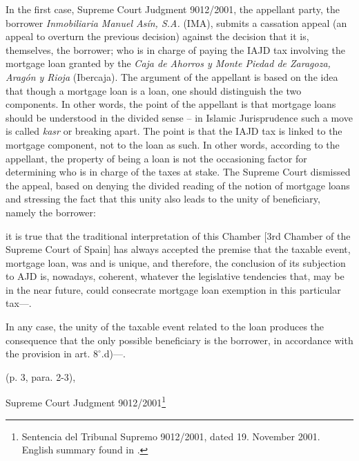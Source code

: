 				In the first case, Supreme Court Judgment 9012/2001, the appellant party, the borrower \textit{Inmobiliaria Manuel Asín, S.A.} (IMA), submits a cassation appeal (an appeal to overturn the previous decision) against the decision that it is, themselves, the borrower; who is in charge of paying the IAJD tax involving the mortgage loan granted by the \textit{Caja de Ahorros y Monte Piedad de Zaragoza, Aragón y Rioja} (Ibercaja). The argument of the appellant is based on the idea that though a mortgage loan is a loan, one should distinguish the two components. In other words, the point of the appellant is that mortgage loans should be understood in the divided sense – in Islamic Jurisprudence such a move is called \textit{kasr} or breaking apart. The point is that the IAJD tax is linked to the mortgage component, not to the loan as such. In other words, according to the appellant, the property of being a loan is not the occasioning factor for determining who is in charge of the taxes at stake. The Supreme Court dismissed the appeal, based on denying the divided reading of the notion of mortgage loans and stressing the fact that this unity also leads to the unity of beneficiary, namely the borrower:
				\begin{itquote}
					[...] it is true that the traditional interpretation of this Chamber [3rd Chamber of the Supreme Court of Spain] has always accepted the premise that the taxable event, mortgage loan, was and is unique, and therefore, the conclusion of its subjection to AJD is, nowadays, coherent, whatever the legislative tendencies that, may be in the near future, could consecrate mortgage loan exemption in this particular tax—.
				\end{itquote} 
				\begin{itquote}
				In any case, the unity of the taxable event related to the loan produces the consequence that the only possible beneficiary is the borrower, in accordance with the provision in art. $8^\circ$.d)—. 
				\end{itquote} 
				\hfill (p. 3, para. 2-3), 
				
				\hfill Supreme Court Judgment 9012/2001\footnote{Sentencia del Tribunal Supremo 9012/2001, dated 19. November 2001. English summary found in \textcite[pp. 245-247]{martinez2022elements}.} \medskip
				
